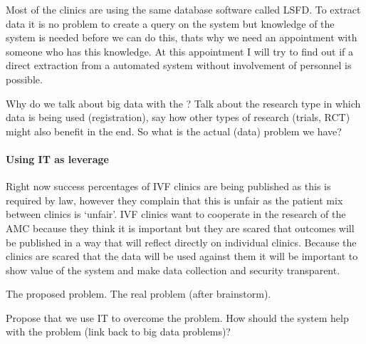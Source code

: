 Most of the clinics are using the same database software called LSFD. 
To extract data it is no problem to create a query on the system but knowledge of the system is needed before we can do this, thats why we need an appointment with someone who has this knowledge. 
At this appointment I will try to find out if a direct extraction from a automated system without involvement of personnel is possible.

Why do we talk about big data with the \project{}?
Talk about the research type in which data is being used (registration), say how other types of research (trials, RCT) might also benefit in the end.
So what is the actual (data) problem we have?

\paragraph{Using IT as leverage}
Right now success percentages of IVF clinics are being published as this is required by law, however they complain that this is unfair as the patient mix between clinics is ‘unfair’. 
IVF clinics want to cooperate in the research of the AMC because they think it is important but they are scared that outcomes will be published in a way that will reflect directly on individual clinics.
Because the clinics are scared that the data will be used against them it will be important to show value of the system and make data collection and security transparent.

The proposed problem.
The real problem (after brainstorm).

Propose that we use IT to overcome the problem.
How should the system help with the problem (link back to big data problems)?


